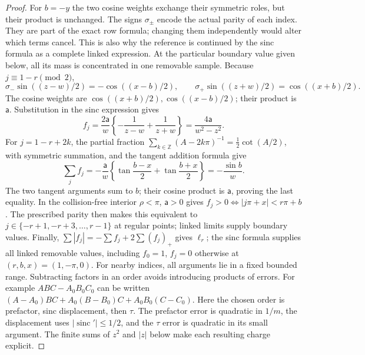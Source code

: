 \begin{proof}
For $b=-y$ the two cosine weights exchange their symmetric roles,
but their product is unchanged. The signs $\sigma_\pm$ encode the
actual parity of each index. They are part of the exact row formula;
changing them independently would alter which terms cancel. This is
also why the reference is continued by the sinc formula as a complete
linked expression. At the particular boundary value given below, all
its mass is concentrated in one removable sample.
Because $j\equiv1-r\pmod2$,
\[
 \sigma_-\sin((z-w)/2)=-\cos((x-b)/2),\qquad
 \sigma_+\sin((z+w)/2)=\cos((x+b)/2).
\]
The cosine weights are $\cos((x+b)/2),\cos((x-b)/2)$;
their product is $\mathsf a$. Substitution in the sinc expression gives
\[
 f_j=\frac{2\mathsf a}{w}\left\{-\frac1{z-w}+\frac1{z+w}\right\}
     =\frac{4\mathsf a}{w^2-z^2}.
\]
For $j=1-r+2k$, the partial fraction
$\sum_{k\in\mathbb Z}(A-2k\pi)^{-1}=\tfrac12\cot(A/2)$,
with symmetric summation, and the tangent addition formula give
\[
 \sum_j f_j=-\frac{\mathsf a}{w}
 \left\{\tan\frac{b-x}{2}+\tan\frac{b+x}{2}\right\}
 =-\frac{\sin b}{w}.
\]
The two tangent arguments sum to $b$; their cosine product is
$\mathsf a$, proving the last equality.
In the collision-free interior $\rho<\pi$, $\mathsf a>0$ gives
$f_j>0\Longleftrightarrow |j\pi+x|<r\pi+b$. The prescribed parity
then makes this equivalent to $j\in\{-r+1,-r+3,\ldots,r-1\}$ at regular
points; linked limits supply boundary values. Finally,
$\sum|f_j|=-\sum f_j+2\sum(f_j)_+$ gives $\ell_r$;
the sinc formula supplies all linked removable values, including
$f_0=1$, $f_j=0$ otherwise at $(r,b,x)=(1,-\pi,0)$.
For nearby indices, all arguments lie in a fixed bounded range.
Subtracting factors in an order avoids introducing products of errors.
For example $ABC-A_0B_0C_0$ can be written
$(A-A_0)BC+A_0(B-B_0)C+A_0B_0(C-C_0)$.
Here the chosen order is prefactor, sinc displacement, then $\tau$.
The prefactor error is quadratic in $1/m$, the displacement uses
$|\operatorname{sinc}'|\leq1/2$, and the $\tau$ error is quadratic
in its small argument. The finite sums of $z^2$ and $|z|$ below
make each resulting charge explicit.


\end{proof}

